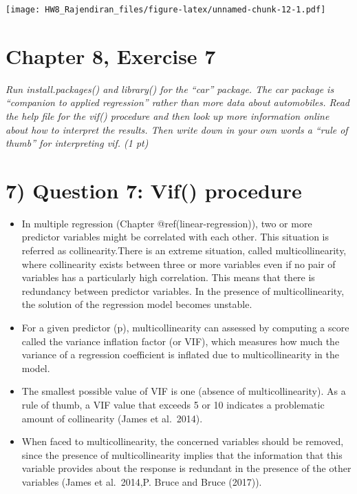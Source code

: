 \documentclass[]{article}
\providecommand{\tightlist}{%
  \setlength{\itemsep}{0pt}\setlength{\parskip}{0pt}}
\begin{document}
\texttt{[image: HW8\_Rajendiran\_files/figure-latex/unnamed-chunk-12-1.pdf]}

\hypertarget{chapter-8-exercise-7}{%
\section{Chapter 8, Exercise 7}\label{chapter-8-exercise-7}}

\emph{Run install.packages() and library() for the ``car'' package. The
car package is ``companion to applied regression'' rather than more data
about automobiles. Read the help file for the vif() procedure and then
look up more information online about how to interpret the results. Then
write down in your own words a ``rule of thumb'' for interpreting vif.
(1 pt)}

\hypertarget{question-7-vif-procedure}{%
\section{7) Question 7: Vif()
procedure}\label{question-7-vif-procedure}}

\begin{itemize}
\tightlist
\item
  In multiple regression (Chapter @ref(linear-regression)), two or more
  predictor variables might be correlated with each other. This
  situation is referred as collinearity.There is an extreme situation,
  called multicollinearity, where collinearity exists between three or
  more variables even if no pair of variables has a particularly high
  correlation. This means that there is redundancy between predictor
  variables. In the presence of multicollinearity, the solution of the
  regression model becomes unstable.
\item
  For a given predictor (p), multicollinearity can assessed by computing
  a score called the variance inflation factor (or VIF), which measures
  how much the variance of a regression coefficient is inflated due to
  multicollinearity in the model.
\item
  The smallest possible value of VIF is one (absence of
  multicollinearity). As a rule of thumb, a VIF value that exceeds 5 or
  10 indicates a problematic amount of collinearity (James et al.~2014).
\item
  When faced to multicollinearity, the concerned variables should be
  removed, since the presence of multicollinearity implies that the
  information that this variable provides about the response is
  redundant in the presence of the other variables (James et al.~2014,P.
  Bruce and Bruce (2017)).
\end{itemize}
\end{document}
